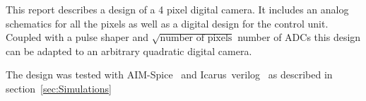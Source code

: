 
This report describes a design of a 4 pixel digital camera.
It includes an analog schematics for all the pixels as well as a digital design for the control unit.
Coupled with a pulse shaper and $\sqrt{\text{number of pixels}}$ number of ADCs this design can be adapted to an arbitrary
quadratic digital camera.

The design was tested with AIM-Spice~\cite{AIMSpice} and Icarus~verilog~\cite{icarusVL} as described in section~\ref{sec:Simulations}